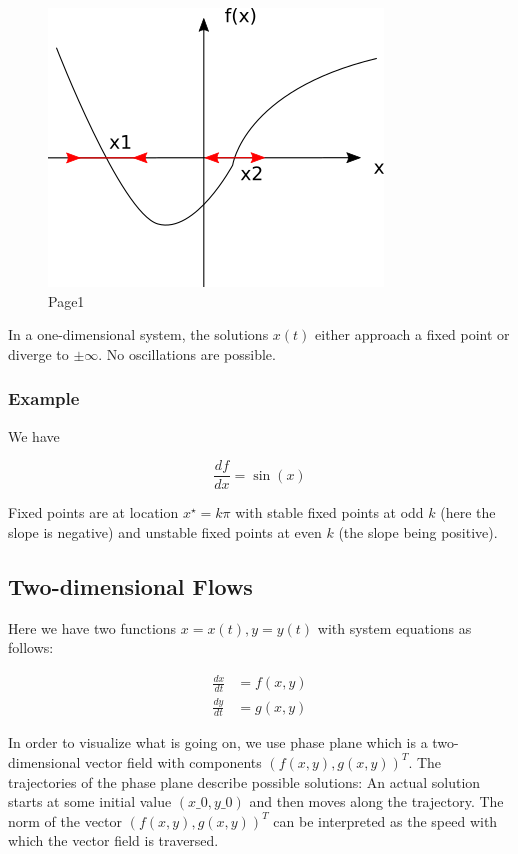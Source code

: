 \begin{figure}[H]
\centering
\includegraphics{images/strogatz_1_1.png}
\caption{Page1}
\end{figure}

In a one-dimensional system, the solutions $x(t)$ either approach a fixed point or diverge to $\pm \infty$. No oscillations are possible.


\subsubsection{Example}

We have

\[
\frac{df}{dx} = \sin(x)
\]

Fixed points are at location $x^\star = k \pi$ with stable fixed points at odd $k$ (here the slope is negative) and unstable fixed points at even $k$ (the slope being positive).

\subsection{Two-dimensional Flows}

Here we have two functions $x=x(t), y=y(t)$ with system equations as follows:


\begin{align*}
\frac{dx}{dt} & = f(x,y) \\
\frac{dy}{dt} & = g(x,y)
\end{align*}


In order to visualize what is going on, we use phase plane which is a
two- dimensional vector field with components $(f(x,y), g(x,y))^T$. The trajectories of the phase plane describe possible solutions: An actual solution starts at some initial value $(x\_0, y\_0)$ and then moves along the trajectory. The norm of the vector $(f(x,y), g(x,y))^T$ can be interpreted as the speed with which the vector field is traversed.

